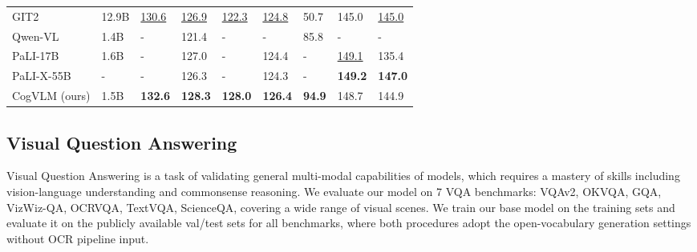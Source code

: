 \begin{table*}[htbp]
{{\begin{tabular}{lp{0.8cm}p{0.8cm}p{0.8cm}p{0.8cm}p{0.8cm}p{0.8cm}p{0.8cm}p{1.1cm}}
        GIT2~\citep{wang2022git} & 12.9B & \underline{130.6} & \underline{126.9} & \underline{122.3} & \underline{124.8} & 50.7 & 145.0 & \underline{145.0} \\
        Qwen-VL~\citep{bai2023qwen} & 1.4B & - & 121.4 & - & - & 85.8 & - & - \\
        PaLI-17B~\citep{chen2022pali} & 1.6B & - & 127.0 & - & 124.4 & - & \underline{149.1} & 135.4 \\
        PaLI-X-55B~\citep{chen2023pali} & - & - & 126.3 & - & 124.3 & - & \textbf{149.2} & \textbf{147.0} \\
        \midrule
        CogVLM (ours) & 1.5B & \textbf{132.6} & \textbf{128.3} & \textbf{128.0} & \textbf{126.4} & \textbf{94.9} & 148.7 & 144.9 \\
\bottomrule
    \end{tabular}
  } }
\end{table*}
%
 

\subsection{Visual Question Answering}


Visual Question Answering is a task of validating general multi-modal capabilities of models, which requires a mastery of skills including vision-language understanding and commonsense reasoning. We evaluate our model on 7 VQA benchmarks: VQAv2, OKVQA, GQA, VizWiz-QA, OCRVQA, TextVQA, ScienceQA, covering a wide range of visual scenes.
We train our base model on the training sets and evaluate it on the publicly available val/test sets for all benchmarks, where both procedures adopt the open-vocabulary generation settings without OCR pipeline input.


